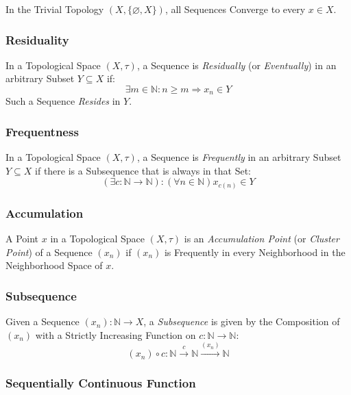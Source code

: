 In the Trivial Topology $(X, \{\varnothing, X\})$, all Sequences
Converge to every $x \in X$.



\subsubsection{Residuality}\label{sec:reside}

In a Topological Space $(X, \tau)$, a Sequence is \emph{Residually}
(or \emph{Eventually}) in an arbitrary Subset $Y \subseteq X$ if:
\[
  \exists m \in \mathbb{N} : n \geq m \Rightarrow x_n \in Y
\]
Such a Sequence \emph{Resides} in $Y$.



\subsubsection{Frequentness}\label{sec:frequent}

In a Topological Space $(X, \tau)$, a Sequence is \emph{Frequently}
in an arbitrary Subset $Y \subseteq X$ if there is a Subsequence that
is always in that Set:
\[
  (\exists c : \mathbb{N} \rightarrow \mathbb{N})
  : (\forall n \in \mathbb{N}) x_{c(n)} \in Y
\]



\subsubsection{Accumulation}\label{sec:accumulation}

A Point $x$ in a Topological Space $(X, \tau)$ is an
\emph{Accumulation Point} (or \emph{Cluster Point}) of a Sequence
$(x_n)$ if $(x_n)$ is Frequently in every Neighborhood in the
Neighborhood Space of $x$.



\subsubsection{Subsequence}\label{sec:subsequence_topology}

Given a Sequence $(x_n) : \mathbb{N} \rightarrow X$, a
\emph{Subsequence} is given by the Composition of $(x_n)$ with a
Strictly Increasing Function on $c : \mathbb{N} \rightarrow
\mathbb{N}$:
\[
  (x_n) \circ c :
  \mathbb{N} \xrightarrow{c} \mathbb{N} \xrightarrow{(x_n)} \mathbb{N}
\]



\subsubsection{Sequentially Continuous Function}
\label{sec:sequentially_continuous}

